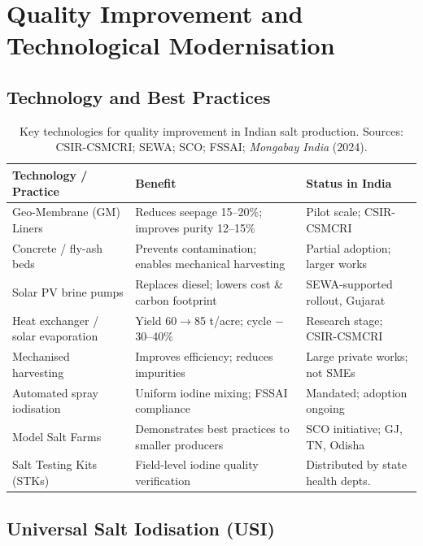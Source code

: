 \documentclass[12pt,a4paper]{article}
\begin{document}
\section{Quality Improvement and Technological Modernisation}

\subsection{Technology and Best Practices}

\begin{table}[H]
\centering
\caption{Key technologies for quality improvement in Indian salt production.
Sources: CSIR-CSMCRI; SEWA; SCO; FSSAI; \textit{Mongabay India} (2024).}
\smallskip
\begin{tabular}{L{4cm} L{5cm} L{4.5cm}}
\toprule
{}
\color{white}\textbf{Technology / Practice} &
\color{white}\textbf{Benefit} &
\color{white}\textbf{Status in India} \\
\midrule
Geo-Membrane (GM) Liners & Reduces seepage 15--20\%; improves purity 12--15\% &
  Pilot scale; CSIR-CSMCRI \\
Concrete / fly-ash beds & Prevents contamination; enables mechanical harvesting &
  Partial adoption; larger works \\
Solar PV brine pumps & Replaces diesel; lowers cost \& carbon footprint &
  SEWA-supported rollout, Gujarat \\
Heat exchanger / solar evaporation & Yield 60$\to$85 t/acre; cycle $-$30--40\% &
  Research stage; CSIR-CSMCRI \\
Mechanised harvesting & Improves efficiency; reduces impurities &
  Large private works; not SMEs \\
Automated spray iodisation & Uniform iodine mixing; FSSAI compliance &
  Mandated; adoption ongoing \\
Model Salt Farms & Demonstrates best practices to smaller producers &
  SCO initiative; GJ, TN, Odisha \\
Salt Testing Kits (STKs) & Field-level iodine quality verification &
  Distributed by state health depts. \\
\bottomrule
\end{tabular}
\end{table}

\subsection{Universal Salt Iodisation (USI)}
\end{document}
